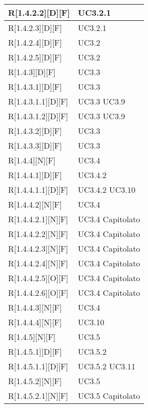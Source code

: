 \begin{longtable}{X | X}
R[1.4.2.2][D][F] & UC3.2.1 \\
\hline
R[1.4.2.3][D][F] & UC3.2.1 \\
\hline
R[1.4.2.4][D][F] & UC3.2 \\
\hline
R[1.4.2.5][D][F] & UC3.2 \\
\hline
R[1.4.3][D][F] & UC3.3 \\
\hline
R[1.4.3.1][D][F] & UC3.3 \\
\hline
R[1.4.3.1.1][D][F] & UC3.3 \newline UC3.9 \\
\hline
R[1.4.3.1.2][D][F] & UC3.3 \newline UC3.9 \\
\hline
R[1.4.3.2][D][F] & UC3.3 \\
\hline
R[1.4.3.3][D][F] & UC3.3 \\
\hline
R[1.4.4][N][F] & UC3.4 \\
\hline
R[1.4.4.1][D][F] & UC3.4.2 \\
\hline
R[1.4.4.1.1][D][F] & UC3.4.2 \newline UC3.10 \\
\hline
R[1.4.4.2][N][F] & UC3.4 \\
\hline
R[1.4.4.2.1][N][F] & UC3.4 \newline Capitolato \\
\hline
R[1.4.4.2.2][N][F] & UC3.4 \newline Capitolato \\
\hline
R[1.4.4.2.3][N][F] & UC3.4 \newline Capitolato \\
\hline
R[1.4.4.2.4][N][F] & UC3.4 \newline Capitolato \\
\hline
R[1.4.4.2.5][O][F] & UC3.4 \newline Capitolato \\
\hline
R[1.4.4.2.6][O][F] & UC3.4 \newline Capitolato \\
\hline
R[1.4.4.3][N][F] & UC3.4 \\
\hline
R[1.4.4.4][N][F] & UC3.10 \\
\hline
R[1.4.5][N][F] & UC3.5 \\
\hline
R[1.4.5.1][D][F] & UC3.5.2 \\
\hline
R[1.4.5.1.1][D][F] & UC3.5.2 \newline UC3.11 \\
\hline
R[1.4.5.2][N][F] & UC3.5 \\
\hline
R[1.4.5.2.1][N][F] & UC3.5 \newline Capitolato \\

\end{longtable}
